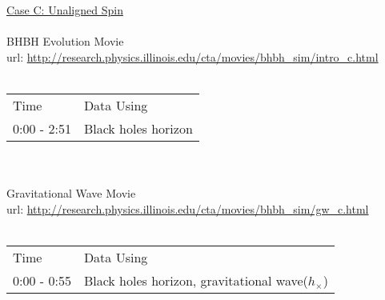 \documentclass{article}
\begin{document}
\\
\\
\underline{Case C: Unaligned Spin} \\
\\
BHBH Evolution Movie \\
url: \url{http://research.physics.illinois.edu/cta/movies/bhbh_sim/intro_c.html} \\
\\
\begin{tabular}{l l}
Time		& Data Using \\
0:00 - 2:51	& Black holes horizon \\
\end{tabular}
\\
\\
Gravitational Wave Movie \\
url: \url{http://research.physics.illinois.edu/cta/movies/bhbh_sim/gw_c.html} \\
\\
\begin{tabular}{l l}
Time		& Data Using \\
0:00 - 0:55	& Black holes horizon, gravitational wave($h_\times$) \\
\end{tabular}





%
%
% 
% 
% 
%	
%
%	
%	
%
%	
\end{document}

